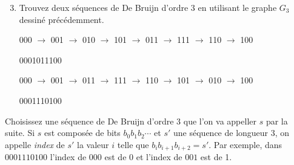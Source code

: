 \documentclass[11pt]{article}
\begin{document}
\begin{enumerate}
\setcounter{enumi}{2}
\item Trouvez deux séquences de De Bruijn d'ordre 3 en utilisant
le graphe $G_3$ dessiné précédemment.  


\begin{solution}

000 $\rightarrow$ 001 $\rightarrow$ 010 $\rightarrow$ 101 $\rightarrow$ 011
$\rightarrow$ 111 $\rightarrow$ 110 $\rightarrow$ 100

0001011100

000 $\rightarrow$ 001 $\rightarrow$ 011 $\rightarrow$ 111 $\rightarrow$ 110
$\rightarrow$ 101 $\rightarrow$ 010 $\rightarrow$ 100

0001110100

\end{solution}
\end{enumerate}


Choisissez une séquence de De Bruijn d'ordre 3 que l'on va appeller $s$
par la suite. Si $s$ est composée de bits $b_0b_1b_2\cdots$ et $s'$ une
séquence de longueur 3, on appelle \emph{index} de $s'$ la valeur $i$
telle que $b_ib_{i+1}b_{i+2}=s'$. Par exemple, dans $0001110100$ l'index
de $000$ est de 0 et l'index de $001$ est de 1.
\end{document}
